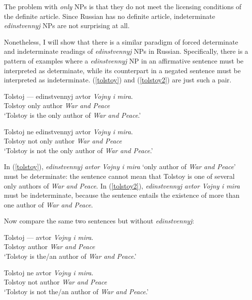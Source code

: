 The problem with \textit{only} NPs is that they do not meet the licensing conditions of the definite article. Since Russian has no definite article, indeterminate \textit{edinstvennyj} NPs are not surprising at all.

Nonetheless, I will show that there is a similar paradigm of forced determinate and indeterminate readings of \textit{edinstvennyj} NPs in Russian. Specifically, there is a pattern of examples where a \textit{edinstvennyj} NP in an affirmative sentence must be interpreted as determinate, while its counterpart in a negated sentence must be interpreted as indeterminate. (\ref{tolstoy}) and (\ref{tolstoy2}) are just such a pair.

\begin{exe}
	\ex \label{tolstoy} \gll Tolstoj --- edinstvennyj avtor \textit{Vojny i mira}.\\
	Tolstoy {} only author \textit{War and Peace}\\
	\glt `Tolstoy is the only author of \textit{War and Peace}.'

	\ex \label{tolstoy2} \gll Tolstoj ne edinstvennyj avtor \textit{Vojny i mira}.\\
	Tolstoy not only author \textit{War and Peace}\\
	\glt `Tolstoy is not the only author of \textit{War and Peace}.'
\end{exe}

In (\ref{tolstoy}), \textit{edinstvennyj avtor Vojny i mira} `only author of \textit{War and Peace}' must be determinate: the sentence cannot mean that Tolstoy is one of several only authors of \textit{War and Peace}. In (\ref{tolstoy2}), \textit{edinstvennyj avtor Vojny i mira} must be indeterminate, because the sentence entails the existence of more than one author of \textit{War and Peace}.

Now compare the same two sentences but without \textit{edinstvennyj}:

\begin{exe}
	\ex \gll Tolstoj --- avtor \textit{Vojny i mira}.\\
	Tolstoy {} author \textit{War and Peace}\\
	\glt `Tolstoy is the/an author of \textit{War and Peace}.'
	
	\ex \gll Tolstoj ne avtor \textit{Vojny i mira}.\\
	Tolstoy not author \textit{War and Peace} \\
	\glt `Tolstoy is not the/an author of \textit{War and Peace}.'
\end{exe}

